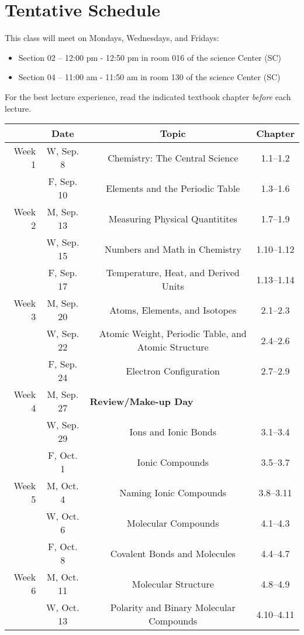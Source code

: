 \documentclass[12pt, letterpaper]{article}
\begin{document}
\section*{Tentative Schedule}
This class will meet on Mondays, Wednesdays, and Fridays:
\begin{itemize}
	\item Section 02 -- 12:00 pm - 12:50 pm in room 016 of the science Center (SC)
	\item Section 04 -- 11:00 am - 11:50 am in room 130 of the science Center (SC)
\end{itemize} 

\noindent For the best lecture experience, read the indicated textbook chapter \emph{before} each lecture.

\noindent
\begin{tabular}{rcccc}
	& Date && Topic & Chapter\\
	\midrule
	Week 1 & W, Sep. 8&& Chemistry: The Central Science & 1.1--1.2\\
	& F, Sep. 10&& Elements and the Periodic Table & 1.3--1.6\\
	\midrule
	Week 2 & M, Sep. 13&& Measuring Physical Quantitites & 1.7--1.9\\
	& W, Sep. 15&& Numbers and Math in Chemistry & 1.10--1.12\\
	& F, Sep. 17&& Temperature, Heat, and Derived Units & 1.13--1.14\\
	\midrule
	Week 3 & M, Sep. 20&& Atoms, Elements, and Isotopes & 2.1--2.3\\
	& W, Sep. 22&& Atomic Weight, Periodic Table, and Atomic Structure & 2.4--2.6\\
	& F, Sep. 24&& Electron Configuration & 2.7--2.9\\
	\midrule
	Week 4 & M, Sep. 27& \multicolumn{3}{l}{\textbf{Review/Make-up Day}}\\
	& W, Sep. 29&& Ions and Ionic Bonds & 3.1--3.4\\
	& F, Oct. 1&& Ionic Compounds & 3.5--3.7\\
	\midrule
	Week 5 & M, Oct. 4&& Naming Ionic Compounds & 3.8--3.11\\
	& W, Oct. 6&& Molecular Compounds & 4.1--4.3\\
	& F, Oct. 8&& Covalent Bonds and Molecules & 4.4--4.7\\
	\midrule
	Week 6 & M, Oct. 11&& Molecular Structure & 4.8--4.9\\
	& W, Oct. 13&& Polarity and Binary Molecular Compounds & 4.10--4.11\\

\end{tabular}
\end{document}
